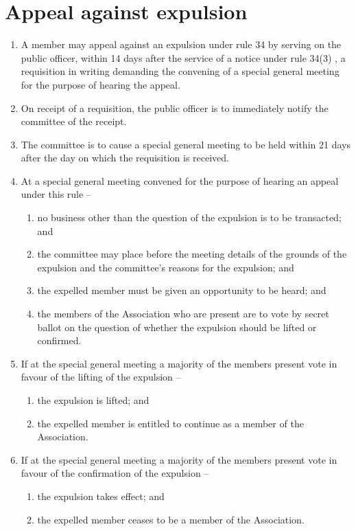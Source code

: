 \documentclass[a4paper,11pt]{article}
\begin{document}
\section{Appeal against expulsion}
\begin{enumerate}
	\item A member may appeal against an expulsion under rule 34 by serving on the public officer, within 14 days after the service of a notice under rule 34(3) , a requisition in writing demanding the convening of a special general meeting for the purpose of hearing the appeal.
	\item On receipt of a requisition, the public officer is to immediately notify the committee of the receipt.
	\item The committee is to cause a special general meeting to be held within 21 days after the day on which the requisition is received.

	\item At a special general meeting convened for the purpose of hearing an appeal under this rule --
	\begin{enumerate}
		\item no business other than the question of the expulsion is to be transacted; and
		\item the committee may place before the meeting details of the grounds of the expulsion and the committee's reasons for the expulsion; and
		\item the expelled member must be given an opportunity to be heard; and
		\item the members of the Association who are present are to vote by secret ballot on the question of whether the expulsion should be lifted or confirmed.
	\end{enumerate}

	\item If at the special general meeting a majority of the members present vote in favour of the lifting of the expulsion --
	\begin{enumerate}
		\item the expulsion is lifted; and
		\item the expelled member is entitled to continue as a member of the Association.
	\end{enumerate}
	
	\item If at the special general meeting a majority of the members present vote in favour of the confirmation of the expulsion --
	\begin{enumerate}
		\item the expulsion takes effect; and
		\item the expelled member ceases to be a member of the Association.
	\end{enumerate}
\end{enumerate}
\end{document}
